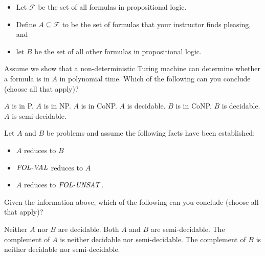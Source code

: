 \documentclass[addpoints]{exam}
\begin{document}
\begin{questions}
\clearpage
\question[6] 
\begin{itemize}
\item Let $\mathcal{F}$ be the set of all formulas in propositional logic.
\item Define $A \subseteq \mathcal{F}$ to be the set of formulas that your instructor
finds pleasing, and
\item let $B$ be the set of all other formulas in propositional logic.
\end{itemize}
Assume we show that a non-deterministic Turing machine can determine
whether a formula is in $A$ in polynomial time. Which of the following can you 
conclude (choose all that apply)?
\begin{checkboxes}
\choice $A$ is in P. 
\CorrectChoice $A$ is in NP. 
\choice $A$ is in CoNP. 
\CorrectChoice $A$ is decidable. 
\CorrectChoice $B$ is in CoNP. 
\CorrectChoice $B$ is decidable. 
\CorrectChoice $A$ is semi-decidable. 
\end{checkboxes}
\vspace{5mm}

\question[4] Let $A$ and $B$ be problems and assume the following facts have
been established:
\begin{itemize}
\item $A$ reduces to $B$
\item $\mbox{\it FOL-VAL\/}$ reduces to $A$
\item $A$ reduces to $\mbox{\it FOL-UNSAT\/}$.
\end{itemize}

Given the information above, which of the following can you conclude (choose all that apply)?
\begin{checkboxes}
\CorrectChoice Neither $A$ nor $B$ are decidable.
\choice  Both $A$ and $B$ are semi-decidable.
\CorrectChoice The complement of $A$ is neither decidable nor semi-decidable. 
\choice The complement of $B$ is neither decidable nor semi-decidable. 
\end{checkboxes}



\vspace{5mm}


\end{questions}
\end{document}
